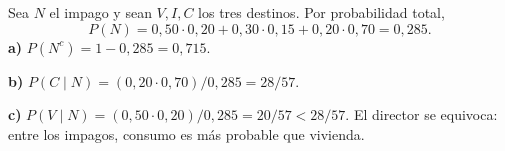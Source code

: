 Sea $N$ el impago y sean $V,I,C$ los tres destinos. Por probabilidad total,
\[
P(N)=0{,}50\cdot0{,}20+0{,}30\cdot0{,}15+0{,}20\cdot0{,}70=0{,}285.
\]
\textbf{a)} $P(N^c)=1-0{,}285=\boxed{0{,}715}$.

\textbf{b)} $P(C\mid N)=(0{,}20\cdot0{,}70)/0{,}285=\boxed{28/57}$.

\textbf{c)} $P(V\mid N)=(0{,}50\cdot0{,}20)/0{,}285=20/57<28/57$. El director se equivoca: entre los impagos, consumo es más probable que vivienda.

